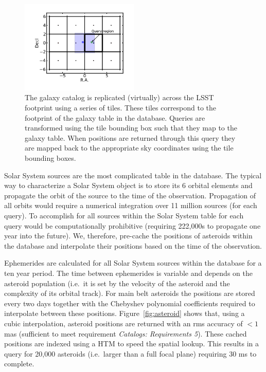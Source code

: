 \documentclass[11pt]{article}
\begin{document}
\begin{figure}[h]
\centering
\includegraphics[width=0.5\textwidth]{validation_figures/basicDemo.png}
\caption{The galaxy catalog is replicated (virtually) across the LSST
  footprint using a series of tiles. These tiles correspond to the
  footprint of the galaxy table in the database. Queries are
  transformed using the tile bounding box such that they map to the
  galaxy table. When positions are returned through this query they
  are mapped back to the appropriate sky coordinates using the tile
  bounding boxes.}
\label{fig:galcoverage}
\end{figure}

Solar System sources are the most complicated table in the
database. The typical way to characterize a Solar System object is to
store its 6 orbital elements and propagate the orbit of the source to
the time of the observation. Propagation of all orbits would require a
numerical integration over 11 million sources (for each query). To
accomplish for all sources within the Solar System table for each
query would be computationally prohibitive (requiring 222,000s to
propagate one year into the future). We, therefore, pre-cache the
positions of asteroids within the database and interpolate their
positions based on the time of the observation.

Ephemerides are calculated for all Solar System sources within the
database for a ten year period. The time between ephemerides is
variable and depends on the asteroid population (i.e.\ it is set by
the velocity of the asteroid and the complexity of its orbital
track). For main belt asteroids the positions are stored every two
days together with the Chebyshev polynomial coefficients required to
interpolate between these positions. Figure~\ref{fig:asteroid} shows that,
using a cubic interpolation, asteroid positions are returned with an
rms accuracy of $<1$ mas (sufficient to meet requirement {\it
  Catalogs: Requirements 5}). These cached positions are indexed using
a HTM to speed the spatial lookup. This results in a query for 20,000
asteroids (i.e.\ larger than a full focal plane) requiring 30 ms to
complete.
\end{document}

